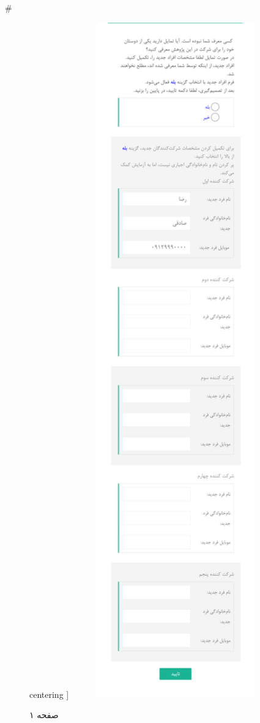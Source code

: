 { 
 # 
\begin{figure}[htpb]
centering ]
\includegraphics[width=0.8\textwidth]{./img/Task37.png/}
\caption{صفحه ۱}
\label{fig:Task1}
\end{figure}
 
}
